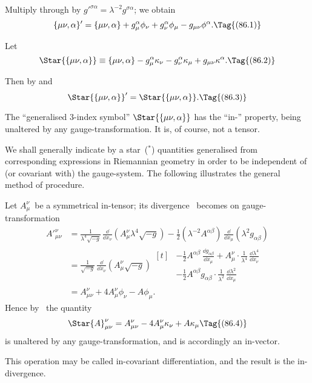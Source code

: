 \documentclass[12pt]{book}
\begin{document}
Multiply through by ${g'}^{\sigma\alpha} = \lambda^{-2} g^{\sigma\alpha}$; we obtain
\[
\{\mu\nu, \alpha\}'
= \{\mu\nu, \alpha\} + g_{\mu}^{\alpha} \phi_{\nu} + g_{\nu}^{\alpha} \phi_{\mu} - g_{\mu\nu} \phi^{\alpha}.
\Tag{(86.1)}
\]

Let
\[
\Star{\{\mu\nu, \alpha\}}
\equiv \{\mu\nu, \alpha\} - g_{\mu}^{\alpha} \kappa_{\nu} - g_{\nu}^{\alpha} \kappa_{\mu} + g_{\mu\nu} \kappa^{\alpha}.
\Tag{(86.2)}
\]

Then by  and~
\[
\Star{\{\mu\nu, \alpha\}}' = \Star{\{\mu\nu, \alpha\}}.
\Tag{(86.3)}
\]

The ``generalised $3$-index symbol'' $\Star{\{\mu\nu, \alpha\}}$ has the ``in-'' property, being
unaltered by any gauge-transformation. It is, of course, not a tensor.

We shall generally indicate by a star~(${}^{*}$) quantities generalised from corresponding
expressions in Riemannian geometry in order to be independent of
(or covariant with) the gauge-system. The following illustrates the general
method of procedure.

Let $A_{\mu}^{\nu}$~be a symmetrical in-tensor; its divergence~ becomes on
gauge-transformation
\begin{align*}
  {A'}_{\mu\nu}^{\nu}
  &= \frac{1}{\lambda^{4} \sqrt{-g}}\, \frac{\dd}{\dd x_{\nu}} (A_{\mu}^{\nu} \lambda^{4} \sqrt{-g})
  - \tfrac{1}{2} (\lambda^{-2} A^{\alpha\beta})\, \frac{\dd}{\dd x_{\mu}} (\lambda^{2} g_{\alpha\beta}) \\
  &= \frac{1}{\sqrt{-g}}\, \frac{\dd}{\dd x_{\nu}} (A_{\mu}^{\nu}\sqrt{-g})
  \begin{aligned}[t]
    &- \tfrac{1}{2} A^{\alpha\beta}\, \frac{\dd g_{\alpha\beta}}{\dd x_{\mu}}
    + A_{\mu}^{\nu} \cdot \frac{1}{\lambda^{4}}\, \frac{\dd\lambda^{4}}{\dd x_{\nu}} \\
    &- \tfrac{1}{2} A^{\alpha\beta} g_{\alpha\beta} \cdot \frac{1}{\lambda^{2}}\, \frac{\dd\lambda^{2}}{\dd x_{\mu}}
  \end{aligned} \\
  &= A_{\mu\nu}^{\nu} + 4A_{\mu}^{\nu} \phi_{\nu} - A\phi_{\mu}.
\end{align*}
Hence by~ the quantity
\[
\Star{A}_{\mu\nu}^{\nu} = A_{\mu\nu}^{\nu} - 4A_{\mu}^{\nu} \kappa_{\nu} + A\kappa_{\mu}
\Tag{(86.4)}
\]
is unaltered by any gauge-transformation, and is accordingly an in-vector.

This operation may be called in-covariant differentiation, and the result is
the in-divergence.
\end{document}
